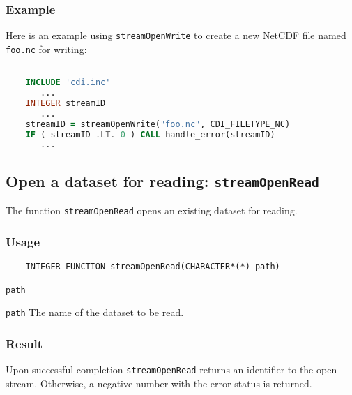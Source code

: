 \subsubsection*{Example}

Here is an example using {\texttt{streamOpenWrite}} to create a new NetCDF file named {\texttt{foo.nc}} for writing:

\begin{lstlisting}[language=Fortran, backgroundcolor=\color{pyellow}, basicstyle=\small, columns=flexible]

    INCLUDE 'cdi.inc'
       ...
    INTEGER streamID
       ...
    streamID = streamOpenWrite("foo.nc", CDI_FILETYPE_NC)
    IF ( streamID .LT. 0 ) CALL handle_error(streamID)
       ...
\end{lstlisting}


\subsection{Open a dataset for reading: \texttt{streamOpenRead}}
\label{streamOpenRead}

The function {\texttt{streamOpenRead}} opens an existing dataset for reading.

\subsubsection*{Usage}

\begin{verbatim}
    INTEGER FUNCTION streamOpenRead(CHARACTER*(*) path)
\end{verbatim}

\hspace*{4mm}\begin{minipage}[]{15cm}
\begin{deflist}{\texttt{path}\ }
\item[\texttt{path}]
The name of the dataset to be read.

\end{deflist}
\end{minipage}

\subsubsection*{Result}

Upon successful completion {\texttt{streamOpenRead}} returns an identifier to the
open stream. Otherwise, a negative number with the error status is returned.


